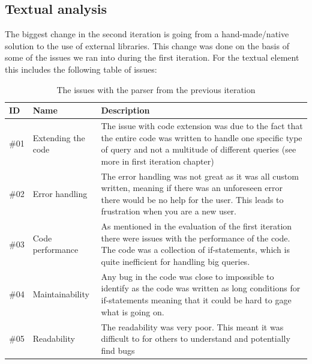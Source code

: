 \subsection{Textual analysis}
The biggest change in the second iteration is going from a hand-made/native solution to the use of external libraries. This change was done on the basis of some of the issues we ran into during the first iteration. For the textual element this includes the following table of issues:
\begin{table}[H]
\begin{tabularx}{\textwidth}{|l|l|X|}
\hline
\rowcolor[HTML]{9B9B9B} 
ID   & Name               & Description                                                                                                                                                                                                \\ \hline
\#01 & Extending the code & The issue with code extension was due to the fact that the entire code was written to handle one specific type of query and not a multitude of different queries (see more in first iteration chapter)     \\ \hline
\#02 & Error handling     & The error handling was not great as it was all custom written, meaning if there was an unforeseen error there would be no help for the user. This leads to frustration when you are a new user.            \\ \hline
\#03 & Code performance   & As mentioned in the evaluation of the first iteration there were issues with the performance of the code. The code was a collection of if-statements, which is quite inefficient for handling big queries. \\ \hline
\#04 & Maintainability    & Any bug in the code was close to impossible to identify as the code was written as long conditions for if-statements meaning that it could be hard to gage what is going on.                               \\ \hline
\#05 & Readability        & The readability was very poor. This meant it was difficult to for others to understand and potentially find bugs                                                                                           \\ \hline
\end{tabularx}
\label{tab:parser-issues}
\caption{The issues with the parser from the previous iteration}
\end{table}

